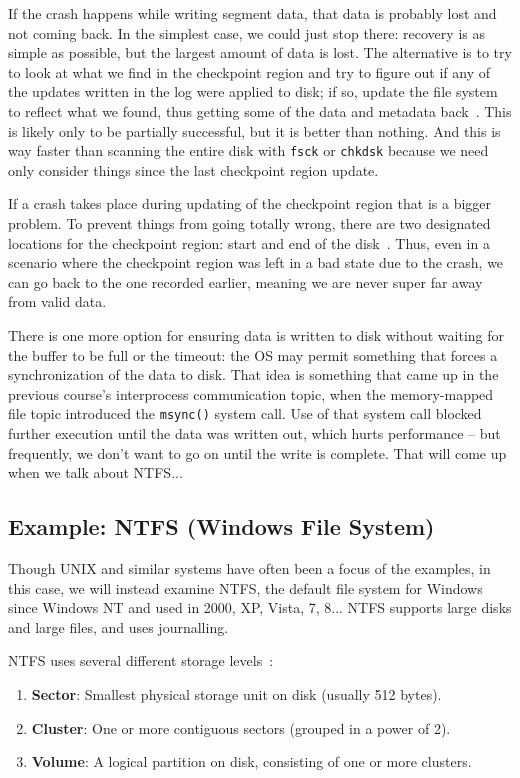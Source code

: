 If the crash happens while writing segment data, that data is probably lost and not coming back. In the simplest case, we could just stop there: recovery is as simple as possible, but the largest amount of data is lost. The alternative is to try to look at what we find in the checkpoint region and try to figure out if any of the updates written in the log were applied to disk; if so, update the file system to reflect what we found, thus getting some of the data and metadata back~\cite{OSTEP}. This is likely only to be partially successful, but it is better than nothing. And this is way faster than scanning the entire disk with \texttt{fsck} or \texttt{chkdsk} because we need only consider things since the last checkpoint region update.

If a crash takes place during updating of the checkpoint region that is a bigger problem. To prevent things from going totally wrong, there are two designated locations for the checkpoint region: start and end of the disk~\cite{OSTEP}. Thus, even in a scenario where the checkpoint region was left in a bad state due to the crash, we can go back to the one recorded earlier, meaning we are never super far away from valid data. 

There is one more option for ensuring data is written to disk without waiting for the buffer to be full or the timeout: the OS may permit something that forces a synchronization of the data to disk. That idea is something that came up in the previous course's interprocess communication topic, when the memory-mapped file topic introduced the \texttt{msync()} system call. Use of that system call blocked further execution until the data was written out, which hurts performance -- but frequently, we don't want to go on until the write is complete. That will come up when we talk about NTFS... 

\subsection*{Example: NTFS (Windows File System)}
Though UNIX and similar systems have often been a focus of the examples, in this case, we will instead examine NTFS, the default file system for Windows since Windows NT and used in 2000, XP, Vista, 7, 8... NTFS supports large disks and large files, and uses journalling. 

NTFS uses several different storage levels~\cite{osi}:

\begin{enumerate}
	\item \textbf{Sector}: Smallest physical storage unit on disk (usually 512 bytes).
	\item \textbf{Cluster}: One or more contiguous sectors (grouped in a power of 2).
	\item \textbf{Volume}: A logical partition on disk, consisting of one or more clusters. 
\end{enumerate}


